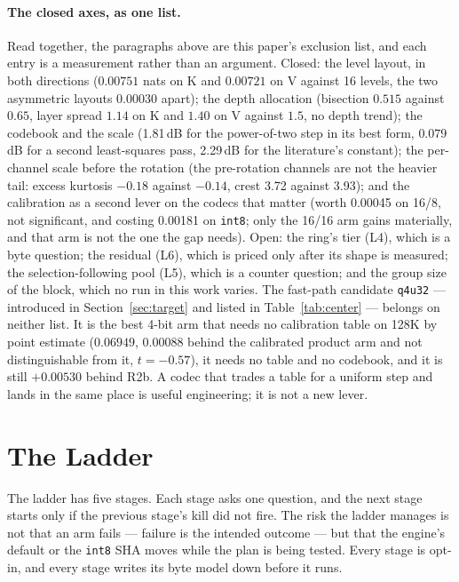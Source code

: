 \documentclass[10pt,twocolumn]{article}
\begin{document}
\paragraph{The closed axes, as one list.} Read together, the paragraphs above are this paper's exclusion list, and each entry is a measurement rather than an argument. Closed: the level layout, in both directions ($0.00751$ nats on K and $0.00721$ on V against 16 levels, the two asymmetric layouts $0.00030$ apart); the depth allocation (bisection $0.515$ against $0.65$, layer spread $1.14$ on K and $1.40$ on V against $1.5$, no depth trend); the codebook and the scale (1.81\,dB for the power-of-two step in its best form, $0.079$\,dB for a second least-squares pass, 2.29\,dB for the literature's constant); the per-channel scale before the rotation (the pre-rotation channels are not the heavier tail: excess kurtosis $-0.18$ against $-0.14$, crest 3.72 against 3.93); and the calibration as a second lever on the codecs that matter (worth 0.00045 on 16/8, not significant, and costing 0.00181 on \texttt{int8}; only the 16/16 arm gains materially, and that arm is not the one the gap needs). Open: the ring's tier (L4), which is a byte question; the residual (L6), which is priced only after its shape is measured; the selection-following pool (L5), which is a counter question; and the group size of the block, which no run in this work varies. The fast-path candidate \texttt{q4u32} --- introduced in Section~\ref{sec:target} and listed in Table~\ref{tab:center} --- belongs on neither list. It is the best 4-bit arm that needs no calibration table on 128K by point estimate ($0.06949$, $0.00088$ behind the calibrated product arm and not distinguishable from it, $t = -0.57$), it needs no table and no codebook, and it is still $+0.00530$ behind R2b. A codec that trades a table for a uniform step and lands in the same place is useful engineering; it is not a new lever.

\section{The Ladder}\label{sec:ladder}

The ladder has five stages. Each stage asks one question, and the next stage starts only if the previous stage's kill did not fire. The risk the ladder manages is not that an arm fails --- failure is the intended outcome --- but that the engine's default or the \texttt{int8} SHA moves while the plan is being tested. Every stage is opt-in, and every stage writes its byte model down before it runs.
\end{document}
